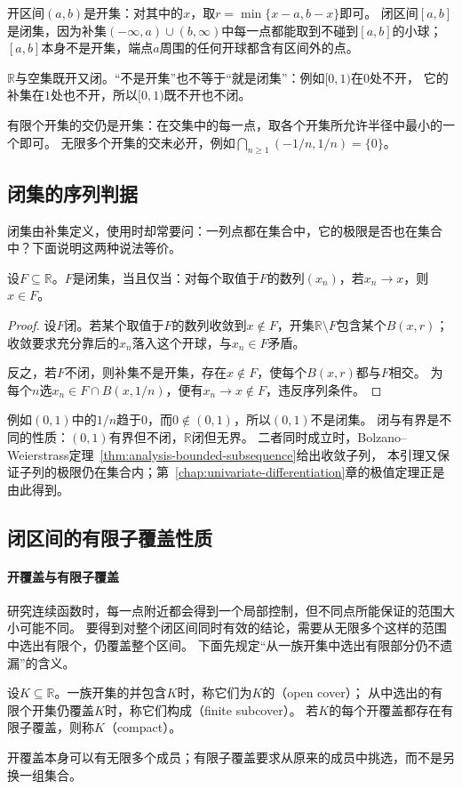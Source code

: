 开区间$(a,b)$是开集：对其中的$x$，取$r=\min\{x-a,b-x\}$即可。
闭区间$[a,b]$是闭集，因为补集$(-\infty,a)\cup(b,\infty)$中每一点都能取到不碰到$[a,b]$的小球；
$[a,b]$本身不是开集，端点$a$周围的任何开球都含有区间外的点。

$\mathbb R$与空集既开又闭。“不是开集”也不等于“就是闭集”：例如$[0,1)$在$0$处不开，
它的补集在$1$处也不开，所以$[0,1)$既不开也不闭。

有限个开集的交仍是开集：在交集中的每一点，取各个开集所允许半径中最小的一个即可。
无限多个开集的交未必开，例如$\bigcap_{n\geq1}(-1/n,1/n)=\{0\}$。

\subsection{闭集的序列判据}

闭集由补集定义，使用时却常要问：一列点都在集合中，它的极限是否也在集合中？下面说明这两种说法等价。

\begin{lemma}[闭集的序列判据]
\label{lem:analysis-closed-sequence-criterion}
设$F\subseteq\mathbb R$。$F$是闭集，当且仅当：对每个取值于$F$的数列$(x_n)$，若$x_n\to x$，则$x\in F$。
\end{lemma}
\begin{proof}
设$F$闭。若某个取值于$F$的数列收敛到$x\notin F$，开集$\mathbb R\setminus F$包含某个$B(x,r)$；
收敛要求充分靠后的$x_n$落入这个开球，与$x_n\in F$矛盾。

反之，若$F$不闭，则补集不是开集，存在$x\notin F$，使每个$B(x,r)$都与$F$相交。
为每个$n$选$x_n\in F\cap B(x,1/n)$，便有$x_n\to x\notin F$，违反序列条件。
\end{proof}

例如$(0,1)$中的$1/n$趋于$0$，而$0\notin(0,1)$，所以$(0,1)$不是闭集。
闭与有界是不同的性质：$(0,1)$有界但不闭，$\mathbb R$闭但无界。
二者同时成立时，Bolzano--Weierstrass定理~\ref{thm:analysis-bounded-subsequence}给出收敛子列，
本引理又保证子列的极限仍在集合内；第~\ref{chap:univariate-differentiation}章的极值定理正是由此得到。

\subsection{闭区间的有限子覆盖性质}

\paragraph{开覆盖与有限子覆盖}

研究连续函数时，每一点附近都会得到一个局部控制，但不同点所能保证的范围大小可能不同。
要得到对整个闭区间同时有效的结论，需要从无限多个这样的范围中选出有限个，仍覆盖整个区间。
下面先规定“从一族开集中选出有限部分仍不遗漏”的含义。
\begin{definition}[开覆盖与紧致性]
\label{def:analysis-compactness}
设$K\subseteq\mathbb R$。一族开集的并包含$K$时，称它们为$K$的（open cover）；
从中选出的有限个开集仍覆盖$K$时，称它们构成（finite subcover）。
若$K$的每个开覆盖都存在有限子覆盖，则称$K$（compact）。
\end{definition}
开覆盖本身可以有无限多个成员；有限子覆盖要求从原来的成员中挑选，而不是另换一组集合。

